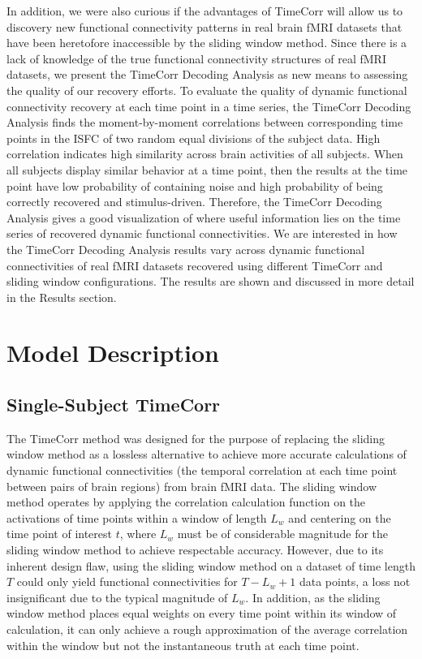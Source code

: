 \documentclass[11pt]{article}
\begin{document}
In addition, we were also curious if the advantages of TimeCorr will allow us to discovery new functional connectivity patterns in real brain fMRI datasets that have been heretofore inaccessible by the sliding window method. Since there is a lack of knowledge of the true functional connectivity structures of real fMRI datasets, we present the TimeCorr Decoding Analysis as new means to assessing the quality of our recovery efforts. To evaluate the quality of dynamic functional connectivity recovery at each time point in a time series, the TimeCorr Decoding Analysis finds the moment-by-moment correlations between corresponding time points in the ISFC of two random equal divisions of the subject data. High correlation indicates high similarity across brain activities of all subjects. When all subjects display similar behavior at a time point, then the results at the time point have low probability of containing noise and high probability of being correctly recovered and stimulus-driven. Therefore, the TimeCorr Decoding Analysis gives a good visualization of where useful information lies on the time series of recovered dynamic functional connectivities. We are interested in how the TimeCorr Decoding Analysis results vary across dynamic functional connectivities of real fMRI datasets recovered using different TimeCorr and sliding window configurations. The results are shown and discussed in more detail in the Results section.

\newpage
\section{Model Description}
\subsection{Single-Subject TimeCorr}
The TimeCorr method was designed for the purpose of replacing the sliding window method as a lossless alternative to achieve more accurate calculations of dynamic functional connectivities (the temporal correlation at each time point between pairs of brain regions) from brain fMRI data. The sliding window method operates by applying the correlation calculation function on the activations of time points within a window of length $L_w$ and centering on the time point of interest $t$, where $L_w$ must be of considerable magnitude for the sliding window method to achieve respectable accuracy. However, due to its inherent design flaw, using the sliding window method on a dataset of time length $T$ could only yield functional connectivities for $T-L_w+1$ data points, a loss not insignificant due to the typical magnitude of $L_w$. In addition, as the sliding window method places equal weights on every time point within its window of calculation, it can only achieve a rough approximation of the average correlation within the window but not the instantaneous truth at each time point.
\end{document}
